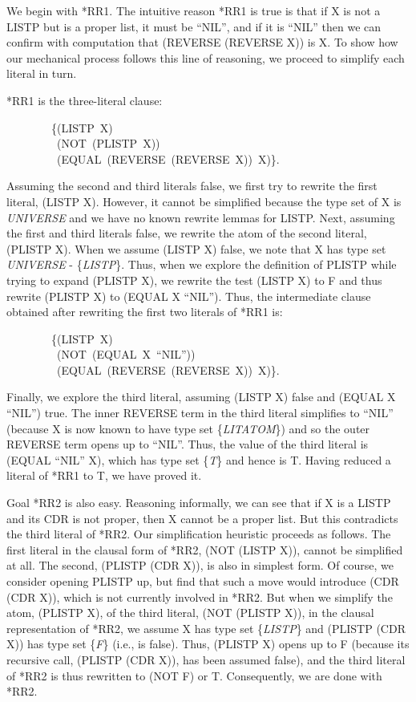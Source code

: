 \documentclass[10pt]{book}
\newenvironment{pubasis}{\begin{flushleft}}{\end{flushleft}}
\begin{document}
We begin with *RR1.  The intuitive reason *RR1 is true is that
if X is not a LISTP but is a proper list, it must be ``NIL'',
and if it is ``NIL'' then we can confirm with computation that (REVERSE (REVERSE X))
is X.  To show how our mechanical process follows this line of reasoning,
we proceed to simplify each literal in turn.

*RR1 is the three-literal clause:
\begin{pubasis}
~~~~~~~~\{(LISTP~X)\\
~~~~~~~~~(NOT~(PLISTP~X))\\
~~~~~~~~~(EQUAL~(REVERSE~(REVERSE~X))~X)\}.\\
\end{pubasis}
Assuming the second and third literals false, we first try to rewrite
the first literal, (LISTP X).  However, it cannot be simplified
because the type set of X is \emph{UNIVERSE} and we have no known rewrite lemmas
for LISTP.
Next, assuming the first and third literals false, we rewrite the atom
of the second literal, (PLISTP X).  When we assume (LISTP X)
false, we note that X has type set
\emph{UNIVERSE} - \{\emph{LISTP}\}.  Thus, when we explore the definition of PLISTP
while trying to expand (PLISTP X), we rewrite the test (LISTP X) to
F and thus rewrite (PLISTP X) to (EQUAL X ``NIL'').  Thus, the intermediate
clause obtained after rewriting the first two literals of *RR1 is:
\begin{pubasis}
~~~~~~~~\{(LISTP~X)\\
~~~~~~~~~(NOT~(EQUAL~X~``NIL''))\\
~~~~~~~~~(EQUAL~(REVERSE~(REVERSE~X))~X)\}.\\
\end{pubasis}
Finally, we explore the third literal, assuming (LISTP X) false and
(EQUAL X ``NIL'') true.  The inner REVERSE term in the third
literal
simplifies to ``NIL'' (because X is now known to have type set
\{\emph{LITATOM}\}) and so the outer REVERSE term opens up
to ``NIL''.  Thus, the value of the third literal is (EQUAL ``NIL'' X),
which has type set \{\emph{T}\} and hence is T.
Having reduced a literal of
*RR1 to T, we have proved it.

Goal *RR2 is also easy.  Reasoning informally, we can see that if X is a LISTP and its CDR
is not proper, then X cannot be a proper list.  But this contradicts the third
literal of *RR2.  Our simplification heuristic proceeds as follows.
The first literal in the clausal form of *RR2, (NOT (LISTP X)), cannot be simplified at all.  The second, (PLISTP (CDR X)), is also
in simplest form.  Of course, we consider opening PLISTP up, but find that
such a move would introduce (CDR (CDR X)), which is not currently involved
in *RR2.  But when we simplify the atom, (PLISTP X), of the third literal,
(NOT (PLISTP X)), in the clausal representation of *RR2,
we assume X has type set \{\emph{LISTP}\} and (PLISTP (CDR X)) has type set \{\emph{F}\}
(i.e., is false).  Thus, (PLISTP X) opens up to F (because
its recursive call, (PLISTP (CDR X)), has been assumed false), and
the third literal of *RR2 is thus rewritten to (NOT F) or T.
Consequently, we are done with *RR2.
\end{document}
